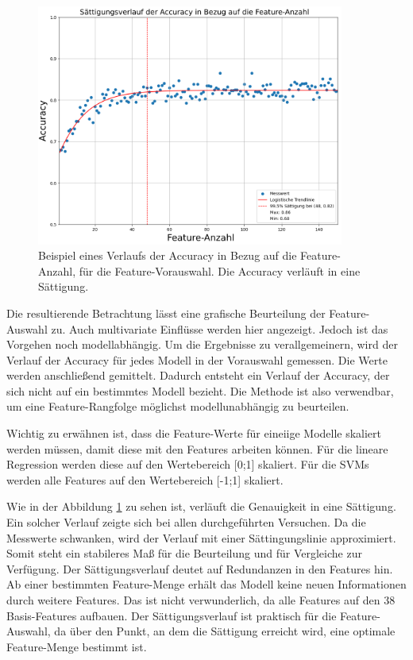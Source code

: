\begin{figure}[htb]
    \centering
    \includegraphics[width=0.9\textwidth]{img/Plots/bsp Accuracy verlauf.png}
    \caption[Beispiel eines Verlaufs der Accuracy in Bezug auf die Feature-Anzahl.]{Beispiel eines Verlaufs der Accuracy in Bezug auf die Feature-Anzahl, für die Feature-Vorauswahl. Die Accuracy verläuft in eine Sättigung.}
    \label{fig:bspSättAccu}
\end{figure}

Die resultierende Betrachtung lässt eine grafische Beurteilung der Feature-Auswahl zu. Auch multivariate Einflüsse werden hier angezeigt. Jedoch ist das Vorgehen noch modellabhängig. Um die Ergebnisse zu verallgemeinern, wird der Verlauf der Accuracy für jedes Modell in der Vorauswahl gemessen. Die Werte werden anschließend gemittelt. Dadurch entsteht ein Verlauf der Accuracy, der sich nicht auf ein bestimmtes Modell bezieht. Die Methode ist also verwendbar, um eine Feature-Rangfolge möglichst modellunabhängig zu beurteilen.\par

Wichtig zu erwähnen ist, dass die Feature-Werte für eineiige Modelle skaliert werden müssen, damit diese mit den Features arbeiten können. Für die lineare Regression werden diese auf den Wertebereich [0;1] skaliert. Für die SVMs werden alle Features auf den Wertebereich [-1;1] skaliert.\par

Wie in der Abbildung \ref{fig:bspSättAccu} zu sehen ist, verläuft die Genauigkeit in eine Sättigung. Ein solcher Verlauf zeigte sich bei allen durchgeführten Versuchen. Da die Messwerte schwanken, wird der Verlauf mit einer Sättingungslinie approximiert. Somit steht ein stabileres Maß für die Beurteilung und für Vergleiche zur Verfügung. Der Sättigungsverlauf deutet auf Redundanzen in den Features hin. Ab einer bestimmten Feature-Menge erhält das Modell keine neuen Informationen durch weitere Features. Das ist nicht verwunderlich, da alle Features auf den 38 Basis-Features aufbauen. Der Sättigungsverlauf ist praktisch für die Feature-Auswahl, da über den Punkt, an dem die Sättigung erreicht wird, eine optimale Feature-Menge bestimmt ist. \par

